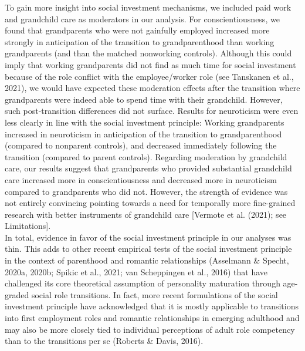 \documentclass[
  english,
  man, noextraspace]{apa7}
\begin{document}
To gain more insight into social investment mechanisms, we included paid work and grandchild care as moderators in our analysis. For conscientiousness, we found that grandparents who were not gainfully employed increased more strongly in anticipation of the transition to grandparenthood than working grandparents (and than the matched nonworking controls). Although this could imply that working grandparents did not find as much time for social investment because of the role conflict with the employee/worker role (see Tanskanen et al., 2021), we would have expected these moderation effects after the transition where grandparents were indeed able to spend time with their grandchild. However, such post-transition differences did not surface. Results for neuroticism were even less clearly in line with the social investment principle: Working grandparents increased in neuroticism in anticipation of the transition to grandparenthood (compared to nonparent controls), and decreased immediately following the transition (compared to parent controls). Regarding moderation by grandchild care, our results suggest that grandparents who provided substantial grandchild care increased more in conscientiousness and decreased more in neuroticism compared to grandparents who did not. However, the strength of evidence was not entirely convincing pointing towards a need for temporally more fine-grained research with better instruments of grandchild care {[}Vermote et al. (2021); see Limitations{]}.\\
In total, evidence in favor of the social investment principle in our analyses was thin. This adds to other recent empirical tests of the social investment principle in the context of parenthood and romantic relationships (Asselmann \& Specht, 2020a, 2020b; Spikic et al., 2021; van Scheppingen et al., 2016) that have challenged its core theoretical assumption of personality maturation through age-graded social role transitions. In fact, more recent formulations of the social investment principle have acknowledged that it is mostly applicable to transitions into first employment roles and romantic relationships in emerging adulthood and may also be more closely tied to individual perceptions of adult role competency than to the transitions per se (Roberts \& Davis, 2016).\\
\end{document}
